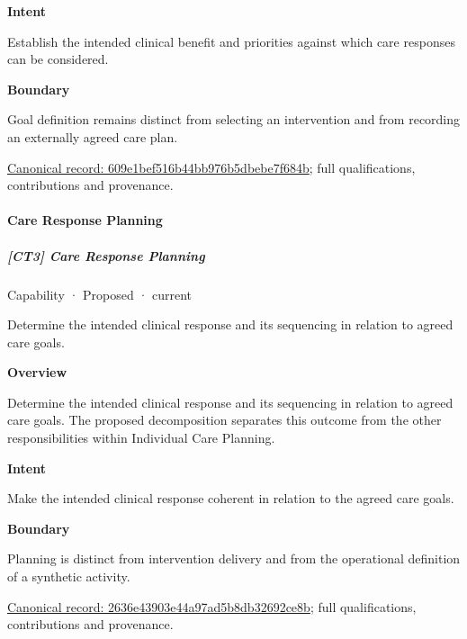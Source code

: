 \textbf{Intent}



Establish the intended clinical benefit and priorities against which care responses can be considered.



\textbf{Boundary}



Goal definition remains distinct from selecting an intervention and from recording an externally agreed care plan.


{\footnotesize \href{../../../../continuum/strategy/capability/609e1bef516b44bb976b5dbebe7f684b.md}{Canonical record: 609e1bef516b44bb976b5dbebe7f684b}; full qualifications, contributions and provenance.}\par
\paragraph{Care Response Planning}

\subparagraph{[CT3] Care Response Planning}

\label{element:2636e43903e44a97ad5b8db32692ce8b}
{\small Capability · Proposed · current}\par

Determine the intended clinical response and its sequencing in relation to agreed care goals.



\textbf{Overview}



Determine the intended clinical response and its sequencing in relation to agreed care goals. The proposed decomposition separates this outcome from the other responsibilities within Individual Care Planning.



\textbf{Intent}



Make the intended clinical response coherent in relation to the agreed care goals.



\textbf{Boundary}



Planning is distinct from intervention delivery and from the operational definition of a synthetic activity.


{\footnotesize \href{../../../../continuum/strategy/capability/2636e43903e44a97ad5b8db32692ce8b.md}{Canonical record: 2636e43903e44a97ad5b8db32692ce8b}; full qualifications, contributions and provenance.}\par
